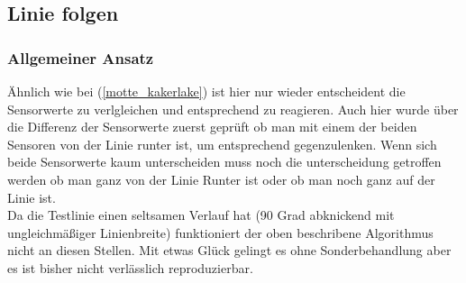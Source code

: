 \subsection{Linie folgen}
\label{linie_folgen}

\subsubsection{Allgemeiner Ansatz}

Ähnlich wie bei  (\ref{motte_kakerlake})  ist hier nur wieder entscheident die Sensorwerte zu verlgleichen und entsprechend zu reagieren. Auch hier wurde über die Differenz der Sensorwerte zuerst geprüft ob man mit einem der beiden Sensoren von der Linie runter ist, um entsprechend gegenzulenken. Wenn sich beide Sensorwerte kaum unterscheiden muss noch die unterscheidung getroffen werden ob man ganz von der Linie Runter ist oder ob man noch ganz auf der Linie ist.
\\
Da die Testlinie einen seltsamen Verlauf hat (90 Grad abknickend mit ungleichmäßiger Linienbreite) funktioniert der oben beschribene Algorithmus nicht an diesen Stellen. Mit etwas Glück gelingt es ohne Sonderbehandlung aber es ist bisher nicht verlässlich reproduzierbar.

